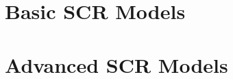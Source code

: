 \documentclass{book}
\begin{document}






\part{Basic SCR Models}



















\part{Advanced SCR Models}









\end{document}
